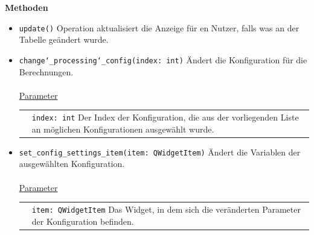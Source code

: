 \documentclass{article}
\begin{document}
\textbf{{Methoden}}
\begin{itemize}
\item \texttt{update()} \newline Operation aktualisiert die Anzeige für en Nutzer, falls was an der Tabelle geändert wurde.

\item \texttt{change\char`_processing\char`_config(index: int)} \newline Ändert die Konfiguration für die Berechnungen.
\\\\
\underline{{Parameter}} \\
\begin{tabular}{lp{10.7cm}}
&\texttt{index: int} Der Index der Konfiguration, die aus der vorliegenden Liste an möglichen Konfigurationen ausgewählt wurde.\\
\end{tabular}


\item \texttt{set\_config\_settings\_item(item: QWidgetItem)} \newline Ändert die Variablen der ausgewählten Konfiguration.
\\\\
\underline{{Parameter}} \\
\begin{tabular}{lp{10.7cm}}
&\texttt{item: QWidgetItem} Das Widget, in dem sich die veränderten Parameter der Konfiguration befinden.\\
\end{tabular}

\end{itemize}
\end{document}
